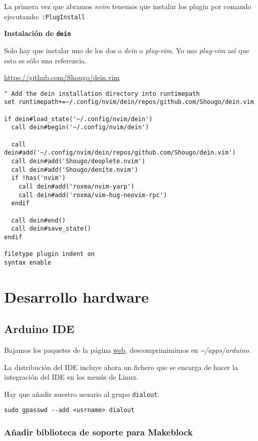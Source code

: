 \documentclass[
  12pt,
  spanish,
]{article}
\begin{document}
La primera vez que abramos \emph{nvim} tenemos que instalar los plugin
por comando ejecutando: \texttt{:PlugInstall}

\textbf{Instalación de \texttt{dein}}

Solo hay que instalar uno de los dos o \emph{dein} o \emph{plug-vim}. Yo
uso \emph{plug-vim} así que esto es sólo una referencia.

\url{https://github.com/Shougo/dein.vim}

\begin{verbatim}
" Add the dein installation directory into runtimepath
set runtimepath+=~/.config/nvim/dein/repos/github.com/Shougo/dein.vim

if dein#load_state('~/.config/nvim/dein')
  call dein#begin('~/.config/nvim/dein')

  call dein#add('~/.config/nvim/dein/repos/github.com/Shougo/dein.vim')
  call dein#add('Shougo/deoplete.nvim')
  call dein#add('Shougo/denite.nvim')
  if !has('nvim')
    call dein#add('roxma/nvim-yarp')
    call dein#add('roxma/vim-hug-neovim-rpc')
  endif

  call dein#end()
  call dein#save_state()
endif

filetype plugin indent on
syntax enable
\end{verbatim}

\hypertarget{desarrollo-hardware}{%
\section{Desarrollo hardware}\label{desarrollo-hardware}}

\hypertarget{arduino-ide}{%
\subsection{Arduino IDE}\label{arduino-ide}}

Bajamos los paquetes de la página \href{https://www.arduino.cc}{web},
descomprimimimos en \emph{\textasciitilde/apps/arduino}.

La distribución del IDE incluye ahora un fichero que se encarga de hacer
la integración del IDE en los menús de Linux.

Hay que añadir nuestro usuario al grupo \texttt{dialout}:

\begin{verbatim}
sudo gpasswd --add <usrname> dialout
\end{verbatim}

\hypertarget{auxf1adir-biblioteca-de-soporte-para-makeblock}{%
\subsubsection{Añadir biblioteca de soporte para
Makeblock}\label{auxf1adir-biblioteca-de-soporte-para-makeblock}}
\end{document}
